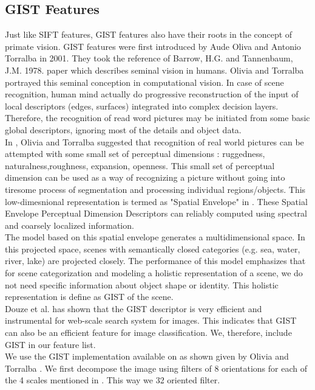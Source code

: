 \subsection{GIST Features}
Just like SIFT features, GIST features also have their roots in the concept of primate vision. GIST features were first introduced by Aude Oliva and Antonio Torralba \cite{GIST} in 2001. They took the reference of Barrow, H.G. and Tannenbaum, J.M. 1978. paper \cite{barrow} which describes seminal vision in humans. Olivia and Torralba \cite{GIST} portrayed this seminal conception in computational vision. In case of scene recognition, human mind actually do progressive reconstruction of the input of local descriptors (edges, surfaces) integrated into complex decision layers. Therefore, the recognition of read word pictures may be initiated from some basic global descriptors, ignoring most of the details and object data.\\
  In \cite{GIST}, Olivia and Torralba suggested that recognition of real world pictures can be attempted with some small set of perceptual dimensions :  ruggedness, naturalness,roughness, expansion, openness.  This small set of perceptual dimension can be used as a way of recognizing a picture without going into tiresome process of segmentation and processing individual regions/objects. This low-dimesnional representation is termed as "Spatial Envelope" in \cite{GIST}. These Spatial Envelope Perceptual Dimension Descriptors can reliably computed using spectral and coarsely localized information.\\
   The model based on this spatial envelope generates a multidimensional space. In this projected space, scenes with semantically closed categories (e.g. sea, water, river, lake) are projected closely. The performance of this model emphasizes that for scene categorization and modeling a holistic representation of a scene, we do not need specific information about object shape or identity. This holistic representation is define as GIST of the scene.\\
  		Douze et al. \cite{douze} has shown that the GIST descriptor is very efficient and instrumental for web-scale search system for images. This indicates that GIST can also be an efficient feature for image classification. We, therefore, include GIST in our feature list.\\
  		We use the GIST implementation available on \cite{gistWebSite} as shown given by Olivia and Torralba \cite{GIST}. We first decompose the image using filters of 8 orientations for each of the 4 scales mentioned in \cite{GIST}.  This way we 32 oriented filter.
